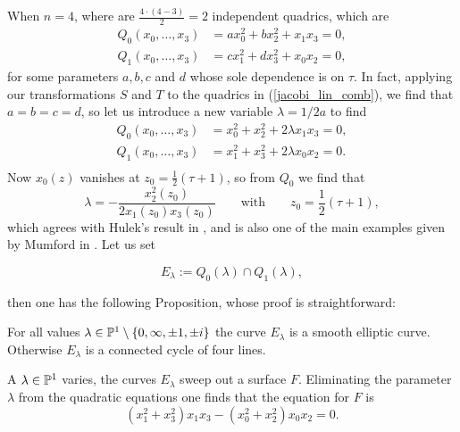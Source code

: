 When $n = 4$, where are $\tfrac{4\cdot (4-3)}{2} = 2$ independent quadrics, which are
\begin{equation}
	\label{jacobi_lin_comb}
	\begin{split}
	Q_{0}(x_{0},\ldots,x_{3}) &= a x_{0}^{2} + b x_{2}^{2} + x_{1}x_{3}=0,\\
	Q_{1}(x_{0},\ldots,x_{3}) &= c x_{1}^{2} + d x_{3}^{2} + x_{0}x_{2}=0,
	\end{split}
\end{equation}
for some parameters $a,b,c$ and $d$ whose sole dependence is on $\tau$. In fact, applying our transformations $S$ and $T$ to the quadrics in (\ref{jacobi_lin_comb}), we find that $a = b = c = d$, so let us introduce a new variable $\lambda = 1/2a$ to find
\begin{equation}
\begin{split}
Q_{0}(x_{0},\ldots,x_{3}) &= x_{0}^{2} + x_{2}^{2} + 2\lambda x_{1}x_{3} = 0,\\
Q_{1}(x_{0},\ldots,x_{3}) &= x_{1}^{2} + x_{3}^{2} + 2\lambda  x_{0}x_{2} = 0.\\
\end{split}
\end{equation}
Now $x_{0}(z)$ vanishes at $z_{0} = \tfrac{1}{2}(\tau + 1)$, so from $Q_{0}$ we find that
\begin{equation*}
	\lambda = - \frac{x_{2}^{2}(z_{0})}{2x_{1}(z_{0})x_{3}(z_{0})}\qquad\text{with}\qquad z_{0} = \frac{1}{2}(\tau + 1),
\end{equation*}
which agrees with Hulek's result in \cite{Hulek_1983}, and is also one of the main examples given by Mumford in \cite{Mumford_1966}. Let us set

\begin{equation}
\label{order_4_quadrics}
	E_{\lambda} := Q_{0}(\lambda) \cap Q_{1}(\lambda),
\end{equation}

then one has the following Proposition, whose proof is straightforward:\\

\begin{prop}
	For all values $\lambda \in \mathbb{P}^{1} \setminus \{0,\infty, \pm 1,\pm i \}$ the curve $E_{\lambda}$ is a smooth elliptic curve. Otherwise $E_{\lambda}$ is a connected cycle of four lines.
\end{prop}

A $\lambda\in\mathbb{P}^{1}$ varies, the curves $E_{\lambda}$ sweep out a surface $F$. Eliminating the parameter $\lambda$ from the quadratic equations one finds that the equation for $F$ is
\begin{equation*}
	(x_{1}^{2} + x_{3}^{2})x_{1}x_{3} - (x_{0}^{2} + x_{2}^{2})x_{0}x_{2} = 0.
\end{equation*}

